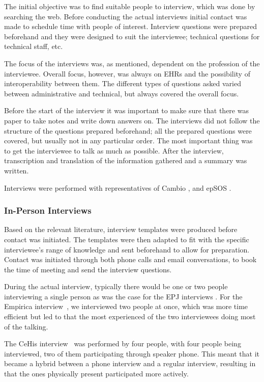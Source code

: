 \documentclass[14pt]{article}
\begin{document}
The initial objective was to find suitable people to interview, which was done by searching the web. Before conducting the actual interviews initial contact was made to schedule time with people of interest. Interview questions were prepared  beforehand and they were designed to suit the interviewee; technical questions for technical staff, etc. 

The focus of the interviews was, as mentioned, dependent on the profession of the interviewee. Overall focus, however, was always on \glspl{EHR} and the possibility of interoperability between them. The different types of questions asked varied between administrative and technical, but always covered the overall focus. 

Before the start of the interview it was important to make sure that there was paper to take notes and write down answers on. The interviews did not follow the structure of the questions prepared beforehand; all the prepared questions were covered, but usually not in any particular order. The most important thing was to get the interviewee to talk as much as possible. After the interview, transcription and translation of the information gathered and a summary was written.

Interviews were performed with representatives of Cambio \cite{Cambio}, and epSOS \cite{epSOS}.

\subsubsection{In-Person Interviews}

Based on the relevant literature, interview templates were produced before contact was initiated. The templates were then adapted to fit with the specific interviewee's range of knowledge and sent beforehand to allow for preparation. Contact was initiated through both phone calls and email conversations, to book the time of meeting and send the interview questions.

During the actual interview, typically there would be one or two people interviewing a single person as was the case for the EPJ interviews \cite{EPJ1} \cite{EPJ2}. For the Empirica interview~\cite{Empirica}, we interviewed two people at once, which was more time efficient but led to that the most experienced of the two interviewees doing most of the talking.

The CeHis interview~\cite{CeHis} was performed by four people, with four people being interviewed, two of them participating through speaker phone. This meant that it became a hybrid between a phone interview and a regular interview, resulting in that the ones physically present participated more actively.
\end{document}
